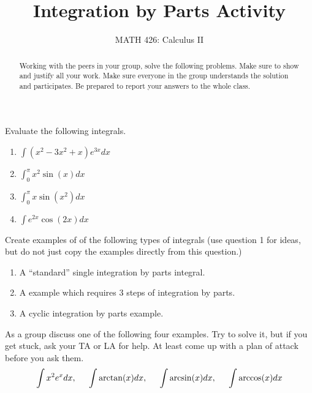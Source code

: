 \documentclass{ximera}
\title{Integration by Parts Activity}
\author{MATH 426: Calculus II}
\begin{document}
\begin{abstract}
   Working with the peers in your group, solve the following problems. Make sure to show and justify all your work. Make sure everyone in the group understands the solution and participates. Be prepared to report your answers to the whole class. 
\end{abstract}
\maketitle

\begin{exercise}
    Evaluate the following integrals.
    \begin{enumerate}
        \item $\displaystyle \int (x^2-3x^2+x)e^{3x}dx$
    
        \item $\displaystyle \int_0^\pi x^2\sin(x)dx$
        
        \item $\displaystyle \int_0^\pi x\sin(x^2)dx$
        
        \item $\displaystyle \int e^{2x}\cos(2x)dx$
        
    \end{enumerate}
\end{exercise}

\begin{exercise}
    Create examples of of the following types of integrals (use question 1 for ideas, but do not just copy the examples directly from this question.)
    \begin{enumerate}
        \item A ``standard'' single integration by parts integral.
        
        \item A example which requires 3 steps of integration by parts.
        
        \item A cyclic integration by parts example.
        
    \end{enumerate}
\end{exercise}

\begin{exercise}
    As a group discuss one of the following four examples.  Try to solve it, but if you get stuck, ask your TA or LA for help.  At least come up with a plan of attack before you ask them. 
\begin{align}
	\int x^2e^x dx,\hspace{.2in}\int \arctan(x)dx, \hspace{.2in}\int \arcsin(x) dx, \hspace{.2in} \int \arccos(x)dx \nonumber
\end{align}
\end{exercise}
\end{document}
